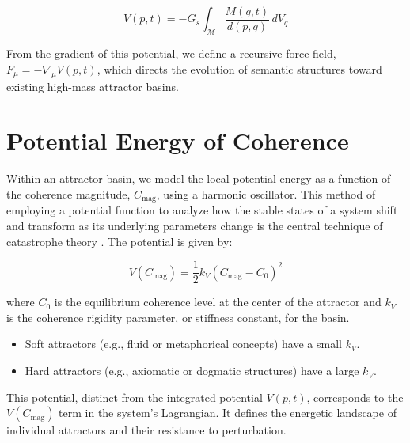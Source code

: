 \begin{equation}
V(p, t) = -G_s \int_{\mathcal{M}} \frac{M(q, t)}{d(p, q)} \, dV_q
\end{equation}

From the gradient of this potential, we define a recursive force field, \(F_\mu = -\nabla_\mu V(p,t)\), which directs the evolution of semantic structures toward existing high-mass attractor basins.


\section{Potential Energy of Coherence}
\label{5.5:potential_energy_of_coherence}

Within an attractor basin, we model the local potential energy as a function of the coherence magnitude, \(C_{\text{mag}}\), using a harmonic oscillator. This method of employing a potential function to analyze how the stable states of a system shift and transform as its underlying parameters change is the central technique of catastrophe theory \autocite{Thom1975}. The potential is given by:

\begin{equation}\label{eq:attractor_potential}
V(C_{\text{mag}}) = \frac{1}{2}k_V(C_{\text{mag}} - C_0)^2
\end{equation}

where \(C_0\) is the equilibrium coherence level at the center of the attractor and \(k_V\) is the coherence rigidity parameter, or stiffness constant, for the basin.

\begin{itemize}

    \item Soft attractors (e.g., fluid or metaphorical concepts) have a small \(k_V\).
    
    \item Hard attractors (e.g., axiomatic or dogmatic structures) have a large \(k_V\).

\end{itemize}

This potential, distinct from the integrated potential \(V(p,t)\), corresponds to the \(V(C_{\text{mag}})\) term in the system's Lagrangian. It defines the energetic landscape of individual attractors and their resistance to perturbation. 
